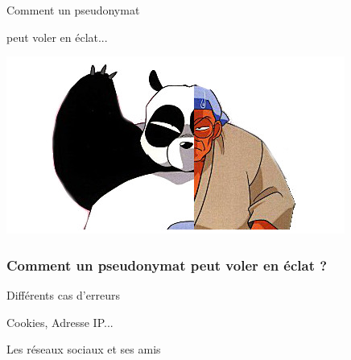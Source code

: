 \documentclass{beamer}
\begin{document}
\begin{frame}
\Huge{\centerline{Comment un pseudonymat}}
\Huge{\centerline{peut voler en éclat...}}
\begin{center}
\includegraphics[scale=0.5]{./images/pseudonymat.jpg}
\end{center}
\end{frame}
\begin{frame}
\frametitle{Comment un pseudonymat peut voler en éclat ?}
\begin{block}{Différents cas d'erreurs}
\begin{itemize}
\end{itemize}
\end{block}

\begin{block}{Cookies, Adresse IP...}
\begin{itemize}
\end{itemize}
\end{block}

\begin{block}{Les réseaux sociaux et ses amis}
\begin{itemize}
\end{itemize}
\end{block}

\end{frame}
\end{document}
